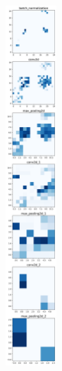 \documentclass[12pt]{article}
\begin{document}
\begin{figure}[htpb]
{			\includegraphics[width=0.17\textwidth]{CNN_middle_layer_output_25x25.png}
		}
\end{figure}
\end{document}

